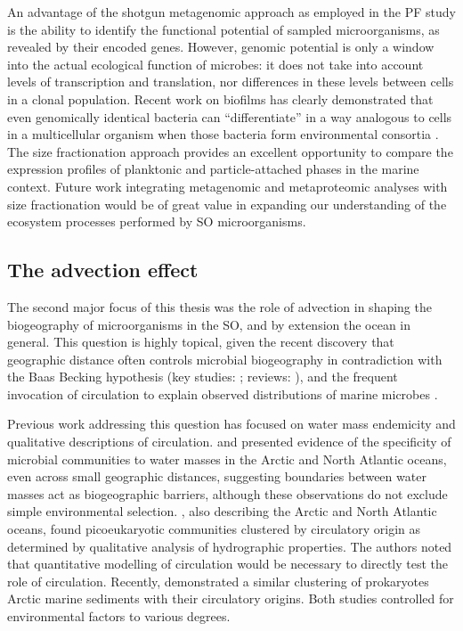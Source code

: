 An advantage of the shotgun metagenomic approach as employed in the \ac{PF} study is the ability to identify the functional potential of sampled microorganisms, as revealed by their encoded genes.
However, genomic potential is only a window into the actual ecological function of microbes: it does not take into account levels of transcription and translation, nor differences in these levels between cells in a clonal population.
Recent work on biofilms has clearly demonstrated that even genomically identical bacteria can ``differentiate'' in a way analogous to cells in a multicellular organism when those bacteria form environmental consortia \cite{Sauer:2002ux}.
The size fractionation approach provides an excellent opportunity to compare the expression profiles of planktonic and particle-attached \citep[i.e.\ potentially biofilm-forming; see][]{Grossart:2003uv} phases in the marine context.
Future work integrating metagenomic and metaproteomic analyses with size fractionation would be of great value in expanding our understanding of the ecosystem processes performed by \ac{SO} microorganisms.

\subsection{The advection effect}

The second major focus of this thesis was the role of advection in shaping the biogeography of microorganisms in the \ac{SO}, and by extension the ocean in general.
This question is highly topical, given the recent discovery that geographic distance often controls microbial biogeography in contradiction with the Baas Becking hypothesis (key studies: \citet{Cho:2000tn,Whitaker:2003dz}; reviews: \citet{Martiny:2006jy,Hanson:2012cb}), and the frequent invocation of circulation to explain observed distributions of marine microbes \citep[e.g.][]{Lauro:2007bf,Giebel:2009hr,Ghiglione:2012ei,Sul:2013in}.

Previous work addressing this question has focused on water mass endemicity and qualitative descriptions of circulation.
\citet{Galand:2009hy} and \citet{Agogue:2011fm} presented evidence of the specificity of microbial communities to water masses in the Arctic and North Atlantic oceans, even across small geographic distances, suggesting boundaries between water masses act as biogeographic barriers, although these observations do not exclude simple environmental selection.
\citet{Hamilton:2008tp}, also describing the Arctic and North Atlantic oceans, found picoeukaryotic communities clustered by circulatory origin as determined by qualitative analysis of hydrographic properties.
The authors noted that quantitative modelling of circulation would be necessary to directly test the role of circulation.
Recently, \citet{Hamdan:2013ko} demonstrated a similar clustering of prokaryotes Arctic marine sediments with their circulatory origins.
Both studies controlled for environmental factors to various degrees.


